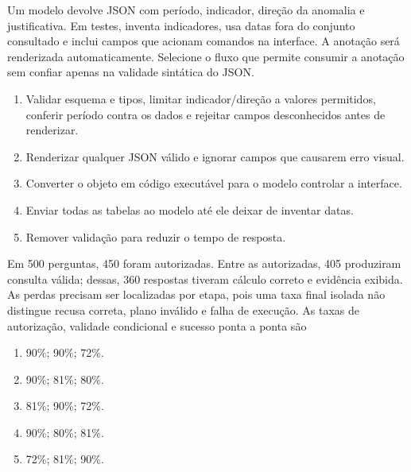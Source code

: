 \TextoBase
Um modelo devolve JSON com período, indicador, direção da anomalia e justificativa. Em testes, inventa indicadores, usa datas fora do conjunto consultado e inclui campos que acionam comandos na interface. A anotação será renderizada automaticamente.
\FonteDidatica
\Comando Selecione o fluxo que permite consumir a anotação sem confiar apenas na validade sintática do JSON.
\begin{enumerate}[label=\Alph*)]
\item Validar esquema e tipos, limitar indicador/direção a valores permitidos, conferir período contra os dados e rejeitar campos desconhecidos antes de renderizar.
\item Renderizar qualquer JSON válido e ignorar campos que causarem erro visual.
\item Converter o objeto em código executável para o modelo controlar a interface.
\item Enviar todas as tabelas ao modelo até ele deixar de inventar datas.
\item Remover validação para reduzir o tempo de resposta.
\end{enumerate}

\TextoBase
Em 500 perguntas, 450 foram autorizadas. Entre as autorizadas, 405 produziram consulta válida; dessas, 360 respostas tiveram cálculo correto e evidência exibida.
As perdas precisam ser localizadas por etapa, pois uma taxa final isolada não distingue recusa correta, plano inválido e falha de execução.
\FonteDidatica
\Comando As taxas de autorização, validade condicional e sucesso ponta a ponta são
\begin{enumerate}[label=\Alph*)]
\item 90\%; 90\%; 72\%.
\item 90\%; 81\%; 80\%.
\item 81\%; 90\%; 72\%.
\item 90\%; 80\%; 81\%.
\item 72\%; 81\%; 90\%.
\end{enumerate}


